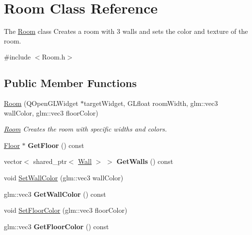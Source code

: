 \hypertarget{class_room}{}\section{Room Class Reference}
\label{class_room}


The \hyperlink{class_room}{Room} class Creates a room with 3 walls and sets the color and texture of the room.  




{\ttfamily \#include $<$Room.\+h$>$}

\subsection*{Public Member Functions}
\begin{DoxyCompactItemize}
\item 
\hyperlink{class_room_a7b347765e9501c064013258629b4de19}{Room} (Q\+Open\+G\+L\+Widget $\ast$target\+Widget, G\+Lfloat room\+Width, glm\+::vec3 wall\+Color, glm\+::vec3 floor\+Color)
\begin{DoxyCompactList}\small\item\em \hyperlink{class_room}{Room} Creates the room with specific widths and colors. \end{DoxyCompactList}\item 
\hypertarget{class_room_ae621e50fd276c68af137ab02666dcee8}{}\hyperlink{class_floor}{Floor} $\ast$ {\bfseries Get\+Floor} () const \label{class_room_ae621e50fd276c68af137ab02666dcee8}

\item 
\hypertarget{class_room_a99f66c521d11492e4699a8f9aca6fa25}{}vector$<$ shared\+\_\+ptr$<$ \hyperlink{class_wall}{Wall} $>$ $>$ {\bfseries Get\+Walls} () const \label{class_room_a99f66c521d11492e4699a8f9aca6fa25}

\item 
void \hyperlink{class_room_a0fee2b31c00e8965934ddb0cba8dab9f}{Set\+Wall\+Color} (glm\+::vec3 wall\+Color)
\item 
\hypertarget{class_room_a4a5c9022582a2acaa29196a45c864e6c}{}glm\+::vec3 {\bfseries Get\+Wall\+Color} () const \label{class_room_a4a5c9022582a2acaa29196a45c864e6c}

\item 
void \hyperlink{class_room_a47df29040992bde5444c485b0b942aad}{Set\+Floor\+Color} (glm\+::vec3 floor\+Color)
\item 
\hypertarget{class_room_a92d642a94fd6a2b65094501e17559b48}{}glm\+::vec3 {\bfseries Get\+Floor\+Color} () const \label{class_room_a92d642a94fd6a2b65094501e17559b48}


\end{DoxyCompactItemize}
